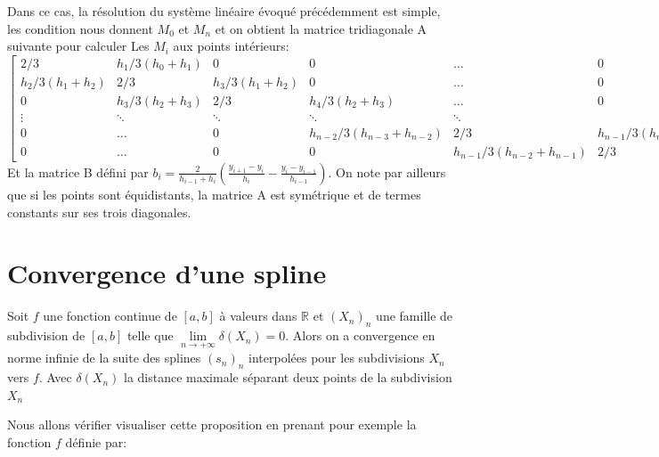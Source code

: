 Dans ce cas, la résolution du système linéaire évoqué précédemment est simple,
les condition nous donnent $M_0$ et $M_n$ et on obtient la matrice tridiagonale
A suivante pour calculer Les $M_i$ aux points intérieurs:
\[
\begin{bmatrix}
    2/3 & h_1/3(h_0+h_1) & 0 & 0 & \dots  & 0 \\
    h_2/3(h_1+h_2) & 2/3 & h_3/3(h_1+h_2) & 0 & \dots  & 0 \\
    0 &  h_3/3(h_2+h_3) & 2/3 & h_4/3(h_2+h_3) & \dots & 0 \\
    \vdots & \ddots & \ddots & \ddots & \ddots \\
    0 & \dots & 0 & h_{n-2}/3(h_{n-3}+h_{n-2}) & 2/3 & h_{n-1}/3(h_{n-3}+h_{n-2}) \\
    0 & \dots & 0 & 0 & h_{n-1}/3(h_{n-2}+h_{n-1}) & 2/3
\end{bmatrix}
\]
Et la matrice B défini par $b_i =  \frac{2}{h_{i-1}+h_{i}} (\frac{y_{i+1} - y_{i}}{h_{i}} - \frac{y_{i} - y_{i-1}}{h_{i-1}})$.
On note par ailleurs que si les points sont équidistants, la matrice A est symétrique et de termes constants sur ses trois diagonales.

\section{Convergence d'une spline}
\begin{proposition}
Soit $f$ une fonction continue de $[a,b]$ à valeurs dans $\mathbb{R}$ et $(X_n)_n$ une famille de subdivision de $[a,b]$ telle que
$\lim\limits_{n \rightarrow +\infty} \delta(X_n) =  0$. Alors on a convergence en norme infinie de la suite des splines $(s_n)_n$ interpolées
pour les subdivisions $X_n$ vers $f$.
Avec $\delta(X_n)$ la distance maximale séparant deux points de la subdivision $X_n$
\end{proposition}

Nous allons vérifier visualiser cette proposition en prenant pour exemple la fonction $f$ définie par:

